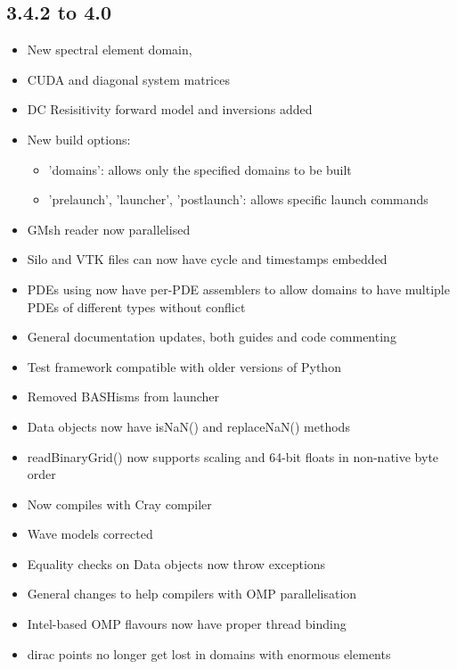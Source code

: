 \subsection*{3.4.2 to 4.0}
\begin{itemize}
  \item New spectral element domain, \speckley
  \item CUDA and diagonal system matrices
  \item DC Resisitivity forward model and inversions added
  \item New build options:
   \begin{itemize}
     \item 'domains': allows only the specified domains to
           be built
     \item 'prelaunch', 'launcher', 'postlaunch': allows specific launch
           commands
   \end{itemize}
  \item GMsh reader now \MPI parallelised
  
  \item Silo and VTK files can now have cycle and timestamps embedded
  \item PDEs using \ripley now have per-PDE assemblers to allow domains to have
        multiple PDEs of different types without conflict
  \item General documentation updates, both guides and code commenting
  \item Test framework compatible with older versions of Python
  \item Removed BASHisms from \escript launcher
  \item Data objects now have isNaN() and replaceNaN() methods
  \item readBinaryGrid() now supports scaling and 64-bit floats in non-native
        byte order
  \item Now compiles with Cray compiler 
  \item Wave models corrected
  \item Equality checks on Data objects now throw exceptions
  \item General changes to help compilers with OMP parallelisation
  \item Intel-based OMP flavours now have proper thread binding
  \item \ripley dirac points no longer get lost in domains with enormous
        elements

\end{itemize}

